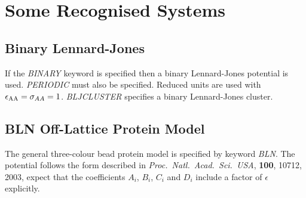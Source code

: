 \documentclass[12pt,a4paper,dvips]{article}
\begin{document}
\section{Some Recognised Systems}

%

\subsection{Binary Lennard-Jones}

If the {\it BINARY\/} keyword is specified then a binary Lennard-Jones
potential is used\cite{sastryds98}. {\it PERIODIC\/} must also be
specified. Reduced units are used with $\epsilon_{\rm AA}=\sigma_{AA}=1$.
{\it BLJCLUSTER\/} specifies a binary Lennard-Jones cluster.

\subsection{BLN Off-Lattice Protein Model}
\label{sec:BLN}

The general three-colour bead protein model is specified by keyword {\it BLN}.
The potential follows the form described in
{\it Proc.~Natl.~Acad.~Sci.~USA}, {\bf 100}, 10712, 2003, expect that
the coefficients $A_i$, $B_i$, $C_i$ and $D_i$ include a factor of $\epsilon$
explicitly.
\end{document}

